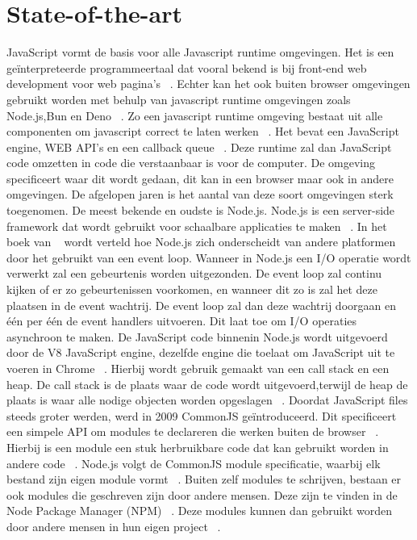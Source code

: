 \section{State-of-the-art}%
\label{sec:state-of-the-art}
JavaScript vormt de basis voor alle Javascript runtime omgevingen. 
Het is een geïnterpreteerde programmeertaal dat vooral bekend is bij front-end web development voor web pagina's ~\autocite{Mozilla2023}.
Echter kan het ook buiten browser omgevingen gebruikt worden met behulp van javascript runtime omgevingen zoals Node.js,Bun en Deno ~\autocite{Mozilla2023}.
Zo een javascript runtime omgeving bestaat uit alle componenten om javascript correct te laten werken ~\autocite{Christopher}. 
Het bevat een JavaScript engine, WEB API's en een callback queue ~\autocite{Christopher}. 
Deze runtime zal dan JavaScript code omzetten in code die verstaanbaar is voor de computer.
De omgeving specificeert waar dit wordt gedaan, dit kan in een browser maar ook in andere omgevingen.
De afgelopen jaren is het aantal van deze soort omgevingen sterk toegenomen. 
De meest bekende en oudste is Node.js. 
Node.js is een server-side framework dat wordt gebruikt voor schaalbare applicaties te maken ~\autocite{Gackenheimer2013}.
In het boek van ~\textcite{Ali2013} wordt verteld hoe Node.js zich onderscheidt van andere platformen door het gebruikt van een event loop. 
Wanneer in Node.js een I/O operatie wordt verwerkt zal een gebeurtenis worden uitgezonden. 
De event loop zal continu kijken of er zo gebeurtenissen voorkomen, 
en wanneer dit zo is zal het deze plaatsen in de event wachtrij. 
De event loop zal dan deze wachtrij doorgaan en één per één de event handlers uitvoeren. 
Dit laat toe om I/O operaties asynchroon te maken.
De JavaScript code binnenin Node.js wordt uitgevoerd door de V8 JavaScript engine, 
dezelfde engine die toelaat om JavaScript uit te voeren in Chrome ~\autocite{Syed2014}.
Hierbij wordt gebruik gemaakt van een call stack en een heap. 
De call stack is de plaats waar de code wordt uitgevoerd,terwijl de heap de plaats is waar alle nodige objecten worden opgeslagen ~\autocite{Christopher}.
Doordat JavaScript files steeds groter werden, werd in 2009 CommonJS geïntroduceerd. 
Dit specificeert een simpele API om modules te declareren die werken buiten de browser ~\autocite{Osmani2012}.
Hierbij is een module een stuk herbruikbare code dat kan gebruikt worden in  andere code ~\autocite{Osmani2012}.
Node.js volgt de CommonJS module specificatie, waarbij elk bestand zijn eigen module vormt ~\autocite{Syed2014}.
Buiten zelf modules te schrijven, bestaan er ook modules die geschreven zijn door andere mensen. 
Deze zijn te vinden in de Node Package Manager (NPM) ~\autocite{Wittern2016}. 
Deze modules kunnen dan gebruikt worden door andere mensen in hun eigen project ~\autocite{Ali2013}.

